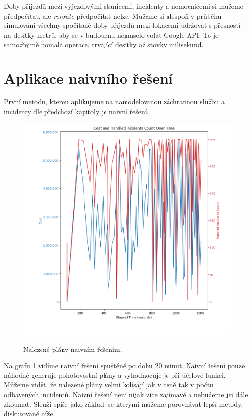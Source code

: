 Doby příjezdů mezi výjezdovými stanicemi, incidenty a nemocnicemi si můžeme předpočítat, ale \textit{reroute} předpočítat nelze.
Můžeme si alespoň v průběhu simulování všechny spočítané doby příjezdů mezi lokacemi udržovat s přesností na desítky metrů,
aby se v budoucnu nemuselo volat Google API. To je samozřejmě pomalá operace, trvající desítky až stovky milisekund. 

\section{Aplikace naivního řešení}

První metodu, kterou aplikujeme na namodelovanou záchrannou službu a incidenty dle předchozí kapitoly je naivní řešení.

\begin{figure}[H]
  \caption{Nalezené plány naivním řešením.}
  \includegraphics[width=\textwidth]{img/plots/naive.png}
  \centering
  \label{img:naive}
\end{figure}

Na grafu \ref{img:naive} vidíme naivní řešení spuštěné po dobu 20 minut.
Naivní řešení pouze náhodně generuje pohotovostní plány a vyhodnocuje je při účelové funkci. Můžeme vidět, že nalezené plány velmi kolísají jak v ceně tak v počtu odbavených incidentů. 
Naivní řešení není nijak více zajímavé a nebudeme jej dále zkoumat. Slouží spíše jako základ, se kterými můžeme porovnávat lepší metody, diskutované níže. 

